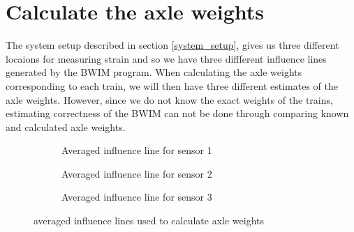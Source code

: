 \section{Calculate the axle weights}
\label{section:calculating_axle_weights}
The system setup described in section \ref{system_setup}, gives us three different locaions for measuring strain and so we have three diffferent influence lines generated by the BWIM program. When calculating the axle weights corresponding to each train, we will then have three different estimates of the axle weights. However, since we do not know the exact weights of the trains, estimating correctness of the BWIM can not be done through comparing known and calculated axle weights.
\begin{figure}[h!]
	\begin{subfigure}[t]{0.8\textwidth}
		
		\caption{Averaged influence line for sensor 1}
		\label{fig:sensor1_averaged}
	\end{subfigure}
	\begin{subfigure}[t]{0.8\textwidth}
		
		\caption{Averaged influence line for sensor 2}
		\label{fig:sensor2_averaged}
	\end{subfigure}
	\begin{subfigure}[t]{0.8\textwidth}
		
		\caption{Averaged influence line for sensor 3}
		\label{fig:sensor3_averaged}
	\end{subfigure}
	\caption{averaged influence lines used to calculate axle weights}
	\label{averaged_infl_lines}
\end{figure}

